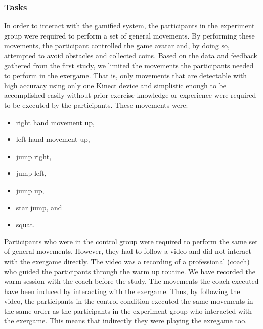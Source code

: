 \subsubsection{Tasks}
In order to interact with the gamified system, the participants in the experiment group were required to perform a set of general movements. By performing these movements, the participant controlled the game avatar and, by doing so, attempted to avoid obstacles and collected coins. Based on the data and feedback gathered from the first study, we limited the movements the participants needed to perform in the exergame. That is, only movements that are detectable with high accuracy using only one Kinect device and simplistic enough to be accomplished easily without prior exercise knowledge or experience were required to be executed by the participants. These movements were: 
\begin{itemize}
\item right hand movement up,
\item left hand movement up,
\item jump right,
\item jump left,
\item jump up, 
\item star jump, and
\item squat.
\end{itemize}
Participants who were in the control group were required to perform the same set of general movements. However, they had to follow a video and did not interact with the exergame directly. The video was a recording of a professional (coach) who guided the participants through the warm up routine. We have recorded the warm session with the coach before the study. The movements the coach executed have been induced by interacting with the exergame. Thus, by following the video, the participants in the control condition executed the same movements in the same order as the participants in the experiment group who interacted with the exergame. This means that indirectly they were playing the exregame too.
